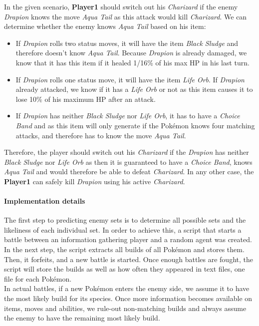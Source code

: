 In the given scenario, \textbf{Player1} should switch out his \textit{Charizard} if the enemy
\textit{Drapion} knows the move \textit{Aqua Tail} as this attack would kill \textit{Charizard}. We can determine 
whether the enemy knows \textit{Aqua Tail} based on his item:
\begin{itemize}
	\item If \textit{Drapion} rolls two status moves, it will have the item \textit{Black Sludge} and therefore 
	doesn't know \textit{Aqua Tail}. Because \textit{Drapion} is already damaged, we know that it has this item
	if it healed 1/16\% of his max \ac{HP} in his last turn. 
	\item If \textit{Drapion} rolls one status move, it will have the item \textit{Life Orb}. If \textit{Drapion}
	already attacked, we know if it has a \textit{Life Orb} or not as this item causes it to lose 10\% of his
	maximum \ac{HP} after an attack.
	\item If \textit{Drapion} has neither \textit{Black Sludge} nor \textit{Life Orb}, it has to have a
	\textit{Choice Band} and as this item will only generate if the Pokémon knows four matching attacks,
	and therefore has to know the move \textit{Aqua Tail}.
\end{itemize}
Therefore, the player should switch out his \textit{Charizard} if the \textit{Drapion} has neither \textit{Black Sludge}
nor \textit{Life Orb} as then it is guaranteed to have a \textit{Choice Band}, knows \textit{Aqua Tail} and would therefore
be able to defeat \textit{Charizard}. In any other case, the \textbf{Player1} can safely kill \textit{Drapion} using his
active \textit{Charizard}.

\paragraph{Implementation details}
\label{sec:build-imp-details}
The first step to predicting enemy sets is to determine all possible sets and the likeliness of each individual set.
In order to achieve this, a script that starts a battle between an information gathering player and 
a random agent was created. In the next step, the script extracts all builds of all Pokémon and stores them. Then, it forfeits, 
and a new battle is started. Once enough battles are fought, the script will store the builds as well as how often
they appeared in text files, one file for each Pokémon. \\
In actual battles, if a new Pokémon enters the enemy side, we assume it to have the most likely build for its species. 
Once more information becomes available on items, moves and abilities, we rule-out non-matching builds and always
assume the enemy to have the remaining most likely build.


